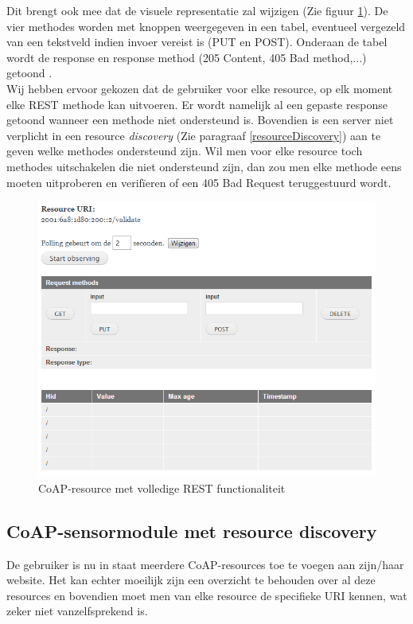Dit brengt ook mee dat de visuele representatie zal wijzigen (Zie figuur \ref{fig:rest}). De vier methodes worden met knoppen weergegeven in een tabel, eventueel vergezeld van een tekstveld indien invoer vereist is (PUT en POST). Onderaan de tabel wordt de response en response method (205 Content, 405 Bad method,...) getoond .\\
Wij hebben ervoor gekozen dat de gebruiker voor elke resource, op elk moment elke REST methode kan uitvoeren. Er wordt namelijk al een gepaste response getoond wanneer een methode niet ondersteund is. Bovendien is een server niet verplicht in een resource \textit{discovery} (Zie paragraaf \ref{resourceDiscovery}) aan te geven welke methodes ondersteund zijn. Wil men voor elke resource toch methodes uitschakelen die niet ondersteund zijn, dan zou men elke methode eens moeten uitproberen en verif\"{i}eren of een 405 Bad Request teruggestuurd wordt.

\begin{figure}[h!]
\centering
\includegraphics[width=1\textwidth]{fig/rest}
\caption{CoAP-resource met volledige REST functionaliteit}
\label{fig:rest}
\end{figure}

\subsection{CoAP-sensormodule met resource discovery}
De gebruiker is nu in staat meerdere CoAP-resources toe te voegen aan zijn/haar website. Het kan echter moeilijk zijn een overzicht te behouden over al deze resources en bovendien moet men van elke resource de specifieke URI kennen, wat zeker niet vanzelfsprekend is.\\

